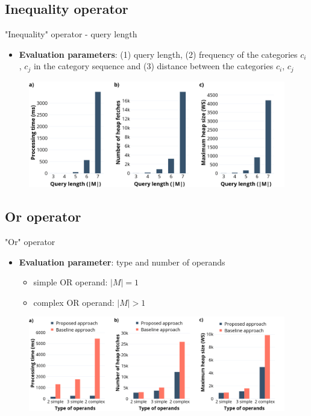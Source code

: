\documentclass[18pt]{beamer}
\begin{document}
	\subsection{Inequality operator}
		\begin{frame}{"Inequality" operator - query length}
		
			\begin{itemize}
				\item \textbf{Evaluation parameters}: (1) query length, (2) frequency of the categories $c_i$, $c_j$ in the category sequence and (3) distance between the categories $c_i$, $c_j$
			\end{itemize}
		
			\begin{figure}[h]
				\includegraphics[scale=0.275]{neo_length.png}
			\end{figure}
		
		\end{frame}
	
	\subsection{Or operator}
		\begin{frame}{"Or" operator}
		
			\begin{itemize}
				\item \textbf{Evaluation parameter}: type and number of operands
				\begin{itemize}
					\item simple OR operand: $|M| = 1$
					\item complex OR operand: $|M| > 1$
				\end{itemize}
			\end{itemize}
		
			\begin{figure}[H]
				\includegraphics[scale=0.25]{or.png}
			\end{figure}
		
		\end{frame}
	
\end{document}

